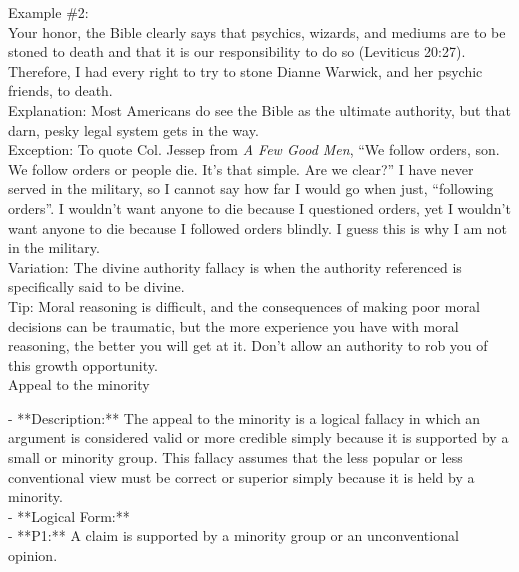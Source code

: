 \documentclass[a4paper,12pt,single,pdftex]{scrbook}
\begin{document}
    
      Example \#2:
    \\

    
      Your honor, the Bible clearly says that psychics, wizards, and mediums are to be stoned to death and that it is our responsibility to do so (Leviticus 20:27).  Therefore, I had every right to try to stone Dianne Warwick, and her psychic friends, to death.
    \\

    
      Explanation: Most Americans do see the Bible as the ultimate authority, but that darn, pesky legal system gets in the way.
    \\

    
      Exception: To quote Col. Jessep from {\it A Few Good Men}, “We follow orders, son. We follow orders or people die. It's that simple. Are we clear?”  I have never served in the military, so I cannot say how far I would go when just, “following orders”.  I wouldn’t want anyone to die because I questioned orders, yet I wouldn’t want anyone to die because I followed orders blindly.  I guess this is why I am not in the military.
    \\

    
      Variation: The divine authority fallacy is when the authority referenced is specifically said to be divine.
    \\

    
      Tip: Moral reasoning is difficult, and the consequences of making poor moral decisions can be traumatic, but the more experience you have with moral reasoning, the better you will get at it. Don’t allow an authority to rob you of this growth opportunity.
    \\

  

Appeal to the minority
    
      - **Description:** The appeal to the minority is a logical fallacy in which an argument is considered valid or more credible simply because it is supported by a small or minority group. This fallacy assumes that the less popular or less conventional view must be correct or superior simply because it is held by a minority.
    \\

    
      - **Logical Form:**
    \\

    
        - **P1:** A claim is supported by a minority group or an unconventional opinion.
    \\
\end{document}
